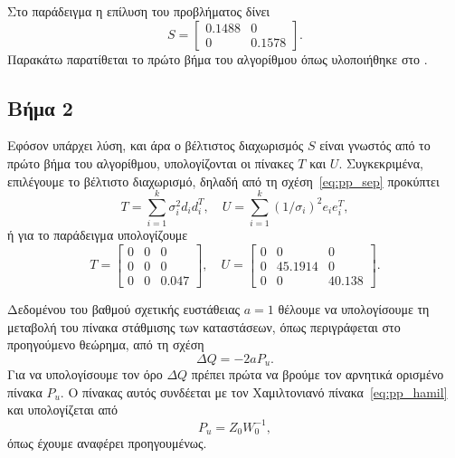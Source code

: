 Στο παράδειγμα η επίλυση του προβλήματος  δίνει
\[
    S =
    \begin{bmatrix}
        0.1488 & 0 \\
        0 & 0.1578
    \end{bmatrix}.
\]
Παρακάτω παρατίθεται το πρώτο βήμα του αλγορίθμου όπως υλοποιήθηκε στο
.
\eng{}

\subsection{Βήμα 2}
Εφόσον υπάρχει λύση, και άρα ο βέλτιστος διαχωρισμός \( S \) είναι
γνωστός από το πρώτο βήμα του αλγορίθμου, υπολογίζονται οι πίνακες
\( T \) και \( U \). Συγκεκριμένα, επιλέγουμε το βέλτιστο διαχωρισμό,
δηλαδή από τη σχέση~\eqref{eq:pp_sep} προκύπτει
\begin{equation}\label{eq:pp_t_u_new}
    T = \sum_{i = 1}^k \sigma_i^2 d_id_i^T, \quad
    U = \sum_{i = 1}^k (1/\sigma_i)^2 e_ie_i^T,
\end{equation}
ή για το παράδειγμα υπολογίζουμε
\[
    T =
    \begin{bmatrix}
        0 & 0 & 0 \\
        0 & 0 & 0 \\
        0 & 0 & 0.047
    \end{bmatrix}, \quad
    U =
    \begin{bmatrix}
        0 & 0 & 0 \\
        0 & 45.1914 & 0 \\
        0 & 0 & 40.138
    \end{bmatrix}.
\]

Δεδομένου του βαθμού σχετικής ευστάθειας \( a = 1 \) θέλουμε να υπολογίσουμε τη
μεταβολή του πίνακα στάθμισης των καταστάσεων, όπως περιγράφεται στο
προηγούμενο θεώρημα, από τη σχέση
\[
    \Delta Q = -2aP_u.
\]
Για να υπολογίσουμε τον όρο \( \Delta Q \) πρέπει πρώτα να βρούμε τον αρνητικά
ορισμένο πίνακα \( P_u \). Ο πίνακας αυτός συνδέεται με τον Χαμιλτονιανό
πίνακα~\eqref{eq:pp_hamil} και υπολογίζεται από
\begin{equation}\label{eq:pp_pu}
    P_u = Z_0 W_0^{-1},
\end{equation}
όπως έχουμε αναφέρει προηγουμένως.

